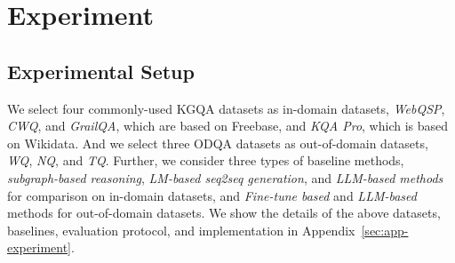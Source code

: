\begin{table}
\small
\centering
{}
\caption{The accuracy on the test set of KQA Pro, which is based on Wikidata KG. The results of Davinci-002, GPT-4, and ChatGPT are evaluated by us and the results of other baselines are copied from~\citet{KQA-Pro}.}
\label{tab:wiki-res}
\end{table}

\section{Experiment}
\label{experiment}
\subsection{Experimental Setup}
\label{sec:app_experiment}
We select four commonly-used KGQA datasets as in-domain datasets, \ie \textit{WebQSP}, \textit{CWQ}, and \textit{GrailQA}, which are based on Freebase, and \textit{KQA Pro}, which is based on Wikidata. And we select three ODQA datasets as out-of-domain datasets, \ie \textit{WQ}, \textit{NQ}, and \textit{TQ}.
Further, we consider three types of baseline methods, \ie \textit{subgraph-based reasoning}, \textit{LM-based seq2seq generation}, and \textit{LLM-based methods} for comparison on in-domain datasets, and \textit{Fine-tune based} and \textit{LLM-based} methods for out-of-domain datasets.
We show the details of the above datasets, baselines, evaluation protocol, and implementation in Appendix~\ref{sec:app-experiment}.


